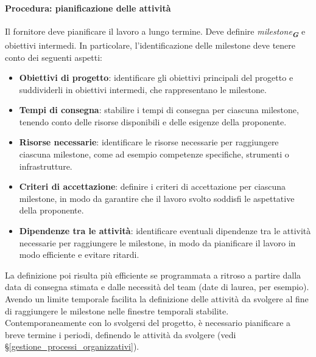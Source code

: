 \documentclass[a4paper,12pt]{article}
\newcommand{\glossario}[1]{\textit{#1}\textsubscript{\textbf{\textit{\textcolor{lightblack}{G}}}}}
\begin{document}
\paragraph{Procedura: pianificazione delle attività}
Il fornitore deve pianificare il lavoro a lungo termine. Deve definire \glossario{milestone} e obiettivi intermedi.
In particolare, l'identificazione delle milestone deve tenere conto dei seguenti aspetti:
\begin{itemize}
    \item \textbf{Obiettivi di progetto}: identificare gli obiettivi principali del progetto e suddividerli in obiettivi intermedi, che rappresentano le milestone.
    \item \textbf{Tempi di consegna}: stabilire i tempi di consegna per ciascuna milestone, tenendo conto delle risorse disponibili e delle esigenze della proponente.
    \item \textbf{Risorse necessarie}: identificare le risorse necessarie per raggiungere ciascuna milestone, come ad esempio competenze specifiche, strumenti o infrastrutture.
    \item \textbf{Criteri di accettazione}: definire i criteri di accettazione per ciascuna milestone, in modo da garantire che il lavoro svolto soddisfi le aspettative della proponente.
    \item \textbf{Dipendenze tra le attività}: identificare eventuali dipendenze tra le attività necessarie per raggiungere le milestone, in modo da pianificare il lavoro in modo efficiente e evitare ritardi.
\end{itemize}
 La definizione poi risulta più efficiente se programmata a ritroso a partire dalla data di consegna stimata e dalle necessità del team (date di laurea, per esempio). Avendo un limite temporale facilita la definizione delle attività da svolgere al fine di raggiungere le milestone nelle finestre temporali stabilite.
Contemporaneamente con lo svolgersi del progetto, è necessario pianificare a
breve termine i periodi, definendo le attività da svolgere (vedi
§\ref{gestione_processi_organizzativi}).
\end{document}
